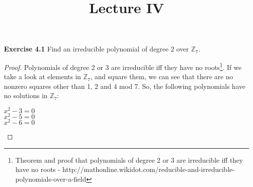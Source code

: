 \documentclass{article}
\title{\vspace{-2cm}Lecture IV\vspace{-2cm}}
\date{}
\begin{document}
\maketitle
\noindent \textbf{Exercise 4.1} Find an irreducible polynomial of degree 2 over $\mathbb{Z}_{7}$.
\begin{proof}
Polynomials of degree 2 or 3 are irreducible iff they have no roots\footnote{Theorem and proof that polynomials of degree 2 or 3 are irreducible iff they have no roots - http://mathonline.wikidot.com/reducible-and-irreducible-polynomials-over-a-field}. If we take a look at elements in $\mathbb{Z}_{7}$, and square them, we can see that there are no nonzero squares other than 1, 2 and 4 mod 7. So, the following polynomials have no solutions in $\mathbb{Z}_{7}$:
\begin{center}
$x^2 - 3 = 0$\\
$x^2 - 5 = 0$\\
$x^2 - 6 = 0$	
\end{center}
\end{proof}
\end{document}
